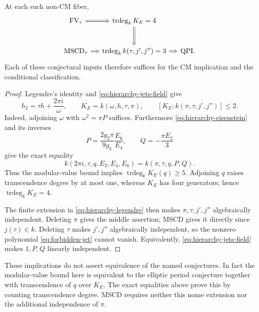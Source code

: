 \begin{proposition}
\label{prop:hierarchy-implications}\label{prop:mscd-cm}\label{prop:hierarchy-fields}
At each such non-CM fiber,
\[
\begin{tikzcd}[column sep=small,row sep=large]
 \mathrm{FV}_\tau
 \arrow[r,Rightarrow]
 &\operatorname{trdeg}_k K_E=4\arrow[d,Rightarrow]&\\
 \mathrm{MSCD}_\tau\arrow[r,Rightarrow]
 &\operatorname{trdeg}_k k(\tau,j',j'')=3
 \arrow[r,Rightarrow]
 &\text{QPI}.
\end{tikzcd}
\]
Each of these conjectural inputs therefore suffices for the
CM implication and the conditional classification.
\end{proposition}
\begin{proof}
Legendre's identity and \eqref{eq:hierarchy-jets-field} give
\begin{equation}\label{eq:hierarchy-legendre}
 h_2=\tau h+\frac{2\pi i}{\omega},\qquad
 K_E=k(\omega,h,\tau,\pi),\qquad
 [K_E:k(\pi,\tau,j',j'')]\le2.
\end{equation}
Indeed, adjoining $\omega$ with $\omega^2=\pi P$ suffices.
Furthermore \eqref{eq:hierarchy-eisenstein} and its inverses
\[
 P=\frac{2g_2\pi}{9g_3}\frac{E_6}{E_4},\qquad
 Q=-\frac{\pi E_2}{3}
\]
give the exact equality
\begin{equation}\label{eq:hierarchy-modular-field}
 k(2\pi i,\tau,q,E_2,E_4,E_6)=k(\pi,\tau,q,P,Q).
\end{equation}
Thus the modular-value bound implies
$\operatorname{trdeg}_k K_E(q)\ge5$.  Adjoining $q$ raises
transcendence degree by at most one, whereas $K_E$ has four generators;
hence $\operatorname{trdeg}_k K_E=4$.

The finite extension in \eqref{eq:hierarchy-legendre} then makes
$\pi,\tau,j',j''$ algebraically independent.  Deleting $\pi$ gives
the middle assertion; MSCD gives it directly since $j(\tau)\in k$.
Deleting $\tau$ makes $j',j''$ algebraically independent, so the
nonzero polynomial \eqref{eq:forbidden-jet} cannot vanish.  Equivalently,
\eqref{eq:hierarchy-jets-field} makes $1,P,Q$ linearly independent.
\end{proof}

These implications do not assert equivalence of the named conjectures.
In fact the modular-value bound here is equivalent to the elliptic
period conjecture together with transcendence of $q$ over $K_E$.
The exact equalities above prove this by counting transcendence degree.
MSCD requires neither this nome extension nor the additional
independence of $\pi$.

